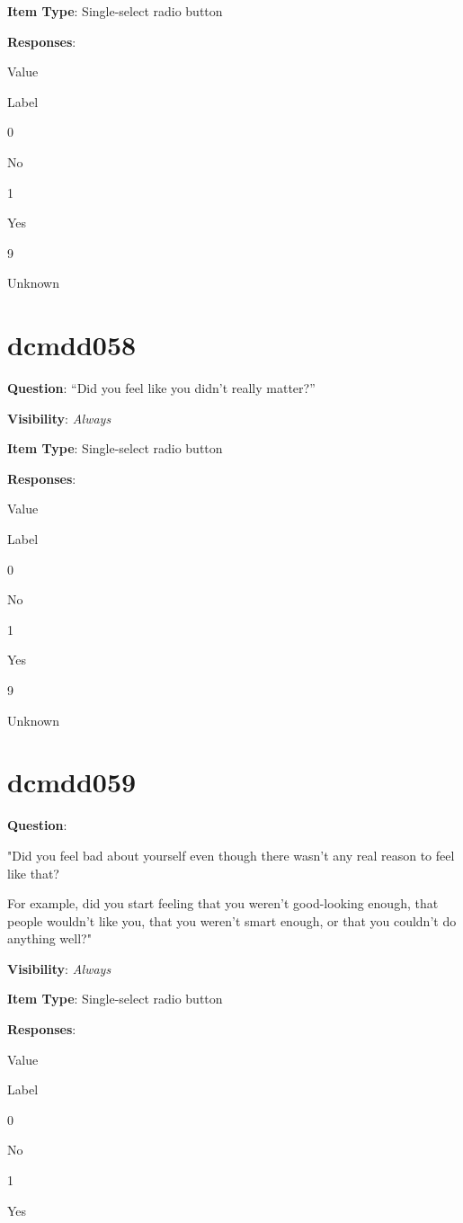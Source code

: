 \documentclass[
]{book}
\begin{document}
\textbf{Item Type}: Single-select radio button

\textbf{Responses}:

Value

Label

0

No

1

Yes

9

Unknown

\hypertarget{dcmdd058}{%
\section{dcmdd058}\label{dcmdd058}}

\textbf{Question}: ``Did you feel like you didn't really matter?''

\textbf{Visibility}: \emph{Always}

\textbf{Item Type}: Single-select radio button

\textbf{Responses}:

Value

Label

0

No

1

Yes

9

Unknown

\hypertarget{dcmdd059}{%
\section{dcmdd059}\label{dcmdd059}}

\textbf{Question}:

"Did you feel bad about yourself even though there wasn't any real reason to feel like that?

For example, did you start feeling that you weren't good-looking enough, that people wouldn't like you, that you weren't smart enough, or that you couldn't do anything well?"

\textbf{Visibility}: \emph{Always}

\textbf{Item Type}: Single-select radio button

\textbf{Responses}:

Value

Label

0

No

1

Yes
\end{document}
